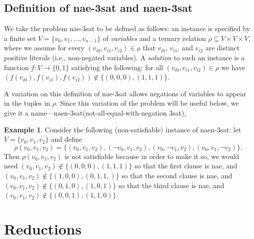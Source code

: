\documentclass[12pt]{amsart}
\numberwithin{equation}{section}
\theoremstyle{plain}
\theoremstyle{definition}
\newtheorem{example}[theorem]{Example}
\newcommand{\sat}{\acs{sat}\xspace}
\newcommand{\nae}{\acs{nae}\xspace}
\newcommand{\naen}{\acs{naen}\xspace}
\begin{document}
\subsection{Definition of \nae-3\sat and \naen-3\sat}
We take the problem \nae-3\sat to be defined as follows:
an instance is specified by a finite set $V = \{v_0, v_1, \dots, v_{n-1}\}$ of
\emph{variables} and a ternary relation
$\rho \subseteq V \times V \times V$, where 
we assume
for every $(v_{i0}, v_{i1}, v_{i2}) \in \rho$ 
that $v_{i0}$, $v_{i1}$,  and $v_{i2}$ are distinct positive literals
(i.e., non-negated variables).
A \emph{solution} to such an instance %
is a function $f: V \to \{0,1\}$
satisfying the following:
for all $(v_{i0}, v_{i1}, v_{i2}) \in \rho$ we have
$(f(v_{i0}), f(v_{i1}), f(v_{i2})) \notin \{(0,0,0), (1,1,1)\}$.


A variation on this definition of \nae-3\sat allows
negations of variables to appear in the tuples in $\rho$.
Since this variation of the problem will be useful below, we give it a
name---\naen-3\sat (not-all-equal-with-negation 3\sat),

\begin{example}
Consider the following (non-satisfiable)
instance of \naen-3\sat:
let $V= \{v_0, v_1, v_2\}$ and define
\[
\rho(v_0, v_1, v_2) =
\{(v_0, v_1, v_2), (\neg v_0, v_1, v_2), (v_0, \neg v_1, v_2), (v_0,
v_1, \neg v_2)\}.
\]
Then $\rho(v_0, v_1, v_2)$ is not satisfiable because in order to make
it so, we would need
$(v_0, v_1, v_2) \notin \{ (0,0,0), (1,1,1)\}$ so that the
first clause is \nae, and $(v_0, v_1, v_2) \notin \{(1,0,0), (0,1,1,)\}$
so that the second clause is \nae, and 
$(v_0, v_1, v_2) \notin \{ (0,1,0), (1,0,1)\}$ so that the third
clause is \nae, and $(v_0, v_1, v_2) \notin \{(0,0,1), (1,1,0)\}$.
\end{example}

\section{Reductions}
\end{document}

